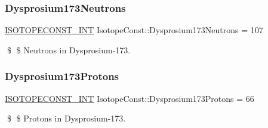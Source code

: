 \subsubsection{\texorpdfstring{Dysprosium173\+Neutrons}{Dysprosium173Neutrons}}
{\footnotesize\ttfamily \mbox{\hyperlink{group___isotope_const-_macros_ga5f18360b3e99483a35c32d789e62621c}{I\+S\+O\+T\+O\+P\+E\+C\+O\+N\+S\+T\+\_\+\+I\+NT}} Isotope\+Const\+::\+Dysprosium173\+Neutrons = 107}

\$ \$ Neutrons in Dysprosium-\/173. \mbox{\label{group___isotope_const-_dysprosium-_dy173_ga94c7bca4aaeb5d9ab8f4b36c00be7337}} 
\subsubsection{\texorpdfstring{Dysprosium173\+Protons}{Dysprosium173Protons}}
{\footnotesize\ttfamily \mbox{\hyperlink{group___isotope_const-_macros_ga5f18360b3e99483a35c32d789e62621c}{I\+S\+O\+T\+O\+P\+E\+C\+O\+N\+S\+T\+\_\+\+I\+NT}} Isotope\+Const\+::\+Dysprosium173\+Protons = 66}

\$ \$ Protons in Dysprosium-\/173. 